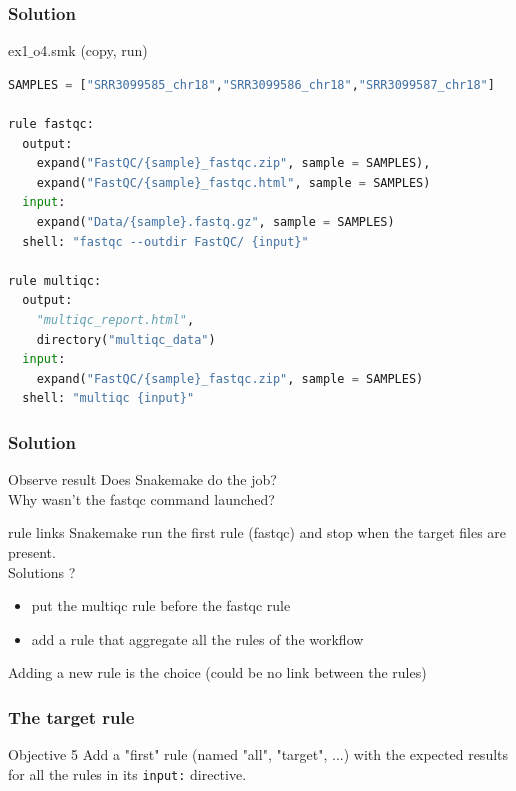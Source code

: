 \begin{frame}[containsverbatim]
\frametitle{Solution}
\begin{exampleblock}{ex1$\_$o4.smk (copy, run)}
\begin{lstlisting}[language=python]
SAMPLES = ["SRR3099585_chr18","SRR3099586_chr18","SRR3099587_chr18"]

rule fastqc:
  output:
    expand("FastQC/{sample}_fastqc.zip", sample = SAMPLES),
    expand("FastQC/{sample}_fastqc.html", sample = SAMPLES)
  input:
    expand("Data/{sample}.fastq.gz", sample = SAMPLES)
  shell: "fastqc --outdir FastQC/ {input}"

rule multiqc:
  output:
    "multiqc_report.html",
    directory("multiqc_data")
  input:
    expand("FastQC/{sample}_fastqc.zip", sample = SAMPLES)
  shell: "multiqc {input}"
\end{lstlisting}
\end{exampleblock}
\end{frame}
\begin{frame}[containsverbatim]
\frametitle{Solution}
\begin{exampleblock}{Observe result}
Does Snakemake do the job?\\
Why wasn't the fastqc command launched?\\
\end{exampleblock}
\begin{exampleblock}{rule links}
Snakemake run the first rule (fastqc) and stop when the target files are present. \\
Solutions ?\begin{itemize}
    \item put the multiqc rule before the fastqc rule
    \item add a rule that aggregate all the rules of the workflow
\end{itemize} 
Adding a new rule is the choice (could be no link between the rules)
\end{exampleblock}
\end{frame}
\begin{frame}[containsverbatim]
\frametitle{The target rule}
\begin{exampleblock}{Objective 5}
Add a "first" rule (named "all", "target", ...) with the expected results for all the rules in its \verb|input:| directive.
\end{exampleblock}
\end{frame}
